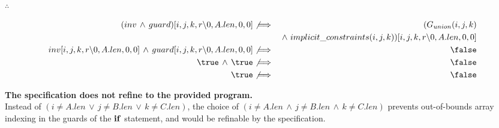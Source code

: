 \documentclass[a4paper]{article}
\newcommand{\DOGUARD}[3]{({#1} \neq A.len\, \lor\, {#2} \neq B.len\, \lor\, {#3} \neq C.len)}
\newcommand{\SUBSTITUTION}{[i, j, k, r \backslash 0, A.len, 0, 0]}
\begin{document}
$\therefore$

\begin{eqnarray*}
(inv\, \land\, guard)\SUBSTITUTION &\not\implies& (G_{union}(i, j, k)\\
&& \land~ implicit\_constraints(i, j, k))\SUBSTITUTION\\
inv\SUBSTITUTION\, \land\, guard\SUBSTITUTION &\not\implies& \false\\
\true\, \land\, \true &\not\implies& \false\\
\true &\not\implies& \false\\
\end{eqnarray*}

\textbf{The specification does not refine to the provided program.}\\

Instead of $\DOGUARD{i}{j}{k}$, the choice of $(i \neq A.len\, \land\, j \neq B.len\, \land\, k \neq C.len)$ prevents out-of-bounds array indexing in the guards of the ${\bf if}$ statement, and would be refinable by the specification.
\end{document}
